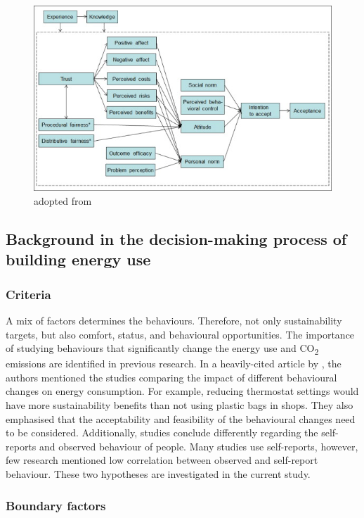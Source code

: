 \documentclass[preprint,12pt,3p]{elsarticle}
\begin{document}
\begin{figure}[H]
    \centering
    \includegraphics{PSYFR.jpg}
    \caption{ adopted from \citep{huijts2012}}
    \label{fig:1}
\end{figure}


\subsection{Background in the decision-making process of building energy use}

\subsubsection{Criteria}


A mix of factors determines the behaviours. Therefore, not only sustainability targets, but also comfort, status, and behavioural opportunities. The importance of studying behaviours that significantly change the energy use and CO\textsubscript{2} emissions are identified in previous research. In a heavily-cited article by \citep{steg2009}, the authors mentioned the studies comparing the impact of different behavioural changes on energy consumption. For example, reducing thermostat settings would have more sustainability benefits than not using plastic bags in shops. They also emphasised that the acceptability and feasibility of the behavioural changes need to be considered. Additionally, studies conclude differently regarding the self-reports and observed behaviour of people. Many studies use self-reports, however, few research mentioned low correlation between observed and self-report behaviour. These two hypotheses are investigated in the current study.  

\subsubsection{Boundary factors}
\end{document}
